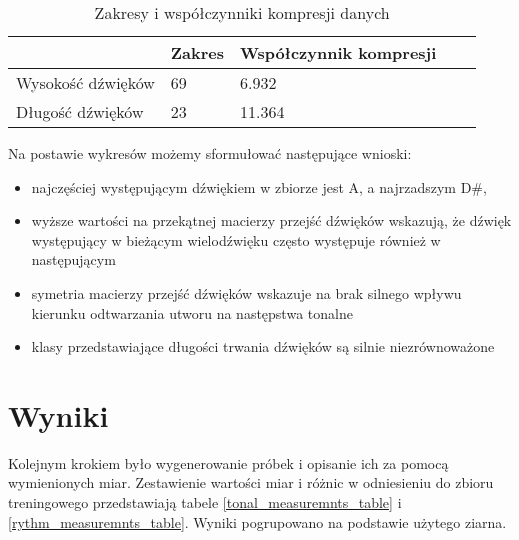 {{        %
        \begin{table}
            \begin{center}
                \begin{tabular}{ |p{2.5cm}|p{2.5cm}|p{2.5cm}|p{2.5cm}|p{2.5cm}| }
                \hline
                 & Zakres & Współczynnik kompresji \\ 
                \hline
                Wysokość dźwięków & 69 & 6.932 \\  
                \hline
                Długość dźwięków & 23 & 11.364 \\
                \hline
                \end{tabular}
            \end{center}
            \caption{Zakresy i współczynniki kompresji danych} \label{range_and_compression}
        \end{table}

        \pagebreak

        Na postawie wykresów możemy sformułować następujące wnioski:
        \begin{itemize}
            \item najczęściej występującym dźwiękiem w zbiorze jest A, a najrzadszym D\#,
            \item wyższe wartości na przekątnej macierzy przejść dźwięków wskazują, że dźwięk występujący w bieżącym wielodźwięku
            często występuje również w następującym
            \item symetria macierzy przejść dźwięków wskazuje na brak silnego wpływu kierunku odtwarzania utworu na następstwa tonalne
            \item klasy przedstawiające długości trwania dźwięków są silnie niezrównoważone
        \end{itemize}
    }

    \section{Wyniki}
    {
        Kolejnym krokiem było wygenerowanie próbek i opisanie ich za pomocą wymienionych miar. Zestawienie wartości miar i różnic
        w odniesieniu do zbioru treningowego przedstawiają tabele \ref{tonal_measuremnts_table} i \ref{rythm_measuremnts_table}. Wyniki pogrupowano na podstawie użytego ziarna.

}}

